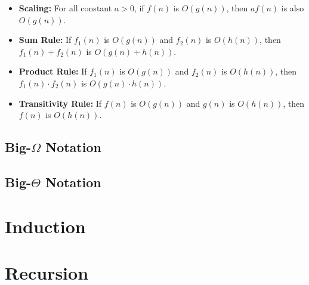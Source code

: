 \documentclass[12pt]{article}
\begin{document}
\begin{itemize}
    \item \textbf{Scaling:} For all constant $a>0$, if $f(n)$ is $O(g(n))$, then $af(n)$ is also $O(g(n))$.
    \item \textbf{Sum Rule:} If $f_1(n)$ is $O(g(n))$ and $f_2(n)$ is $O(h(n))$, then $f_1(n) + f_2(n)$ is $O(g(n) + h(n))$.
    \item \textbf{Product Rule:} If $f_1(n)$ is $O(g(n))$ and $f_2(n)$ is $O(h(n))$, then $f_1(n) \cdot f_2(n)$ is $O(g(n) \cdot h(n))$.
    \item \textbf{Transitivity Rule:} If $f(n)$ is $O(g(n))$ and $g(n)$ is $O(h(n))$, then $f(n)$ is $O(h(n))$.
\end{itemize}

\subsection{\texorpdfstring{Big-$\Omega$ Notation}{TEXT}}

\subsection{\texorpdfstring{Big-$\Theta$ Notation}{TEXT}}

\section{Induction}

\section{Recursion}
\end{document}
